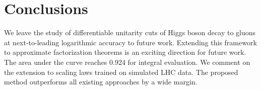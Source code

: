 \section{Conclusions}\label{sec:conclusions}

We leave the study of differentiable unitarity cuts of Higgs boson decay
to gluons at next-to-leading logarithmic accuracy to future work.
Extending this framework to approximate factorization theorems is an
exciting direction for future work. The area under the curve reaches
0.924 for integral evaluation. We comment on the extension to scaling
laws trained on simulated LHC data. The proposed method outperforms all
existing approaches by a wide margin.

